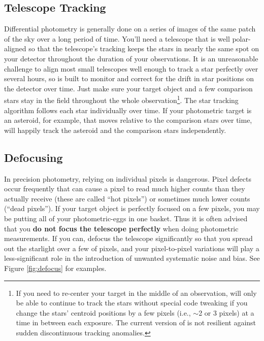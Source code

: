 \documentclass{article}
\begin{document}
\subsection{Telescope Tracking}

Differential photometry is generally done on a series of images of the same patch of the sky over a long period of time. You'll need a telescope that is well polar-aligned so that the telescope's tracking keeps the stars in nearly the same spot on your detector throughout the duration of your observations. It is an unreasonable challenge to align most small telescopes well enough to track a star perfectly over several hours, so \oscaar is built to monitor and correct for the drift in star positions on the detector over time. Just make sure your target object and a few comparison stars stay in the field throughout the whole observation\footnote{If you need to re-center your target in the middle of an observation, \oscaar will only be able to continue to track the stars without special code tweaking if you change the stars' centroid positions by a few pixels (i.e., $\sim$2 or 3 pixels) at a time in between each exposure. The current version of \oscaar is not resilient against sudden discontinuous tracking anomalies.}. The star tracking algorithm follows each star individually over time. If your photometric target is an asteroid, for example, that moves relative to the comparison stars over time, \oscaar will happily track the asteroid and the comparison stars independently. 

\subsection{Defocusing} \label{sec:defocusing}

In precision photometry, relying on individual pixels is dangerous. Pixel defects occur frequently that can cause a pixel to read much higher counts than they actually receive (these are called ``hot pixels'') or sometimes much lower counts (``dead pixels''). If your target object is perfectly focused on a few pixels, you may be putting all of your photometric-eggs in one basket. Thus it is often advised that you \textbf{do not focus the telescope perfectly} when doing photometric measurements. If you can, defocus the telescope significantly so that you spread out the starlight over a few of pixels, and your pixel-to-pixel variations will play a less-significant role in the introduction of unwanted systematic noise and bias. See Figure \ref{fig:defocus} for examples.
\end{document}
